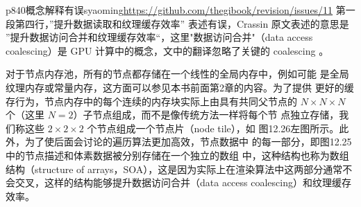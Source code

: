 \begin{revision}{p840}{概念解释有误}{syaoming}{\url{https://github.com/thegibook/revision/issues/11}}
	第一段第四行，”提升数据读取和纹理缓存效率” 表述有误，Crassin 原文表述的意思是 ”提升数据访问合并和纹理缓存效率“，这里"数据访问合并"（data access coalescing）是 GPU 计算中的概念，文中的翻译忽略了关键的 coalescing 。
\end{revision}
对于节点内存池，所有的节点都存储在一个线性的全局内存中，例如可能 是全局纹理内存或常量内存，这方面可以参见本书前面第2章的内容。为了提供 更好的缓存行为，节点内存中的每个连续的内存块实际上由具有共同父节点的 $N\times N\times N$ 个（这里 $N = 2$）子节点组成，而不是像传统方法一样将每个节 点独立存储，我们称这些 $2\times 2\times 2$ 个节点组成一个节点片（node tile），如 图12.26左图所示。此外，为了使后面会讨论的遍历算法更加高效，节点数据中 的每一部分，即图12.25中的节点描述和体素数据被分别存储在一个独立的数组 中，这种结构也称为数组结构（structure of arrays，SOA），这是因为实际上在渲染算法中这两部分通常不会交叉，这样的结构能够提升数据访问合并（data access coalescing）和纹理缓存效率。













